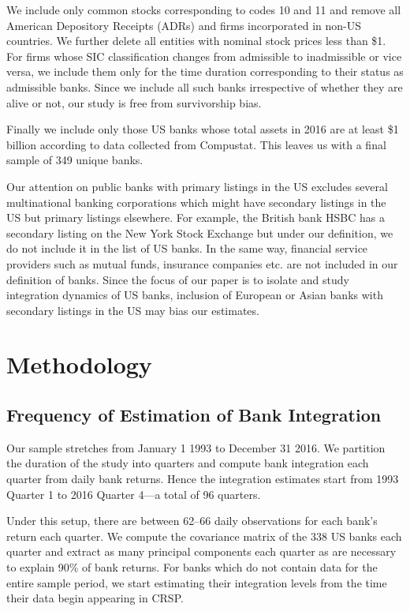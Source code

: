 \documentclass[11pt,]{article}
\begin{document}
We include only common stocks corresponding to codes 10 and 11 and
remove all American Depository Receipts (ADRs) and firms incorporated in
non-US countries. We further delete all entities with nominal stock
prices less than \$1. For firms whose SIC classification changes from
admissible to inadmissible or vice versa, we include them only for the
time duration corresponding to their status as admissible banks. Since
we include all such banks irrespective of whether they are alive or not,
our study is free from survivorship bias.

Finally we include only those US banks whose total assets in 2016 are at
least \$1 billion according to data collected from Compustat. This
leaves us with a final sample of 349 unique banks.

Our attention on public banks with primary listings in the US excludes
several multinational banking corporations which might have secondary
listings in the US but primary listings elsewhere. For example, the
British bank HSBC has a secondary listing on the New York Stock Exchange
but under our definition, we do not include it in the list of US banks.
In the same way, financial service providers such as mutual funds,
insurance companies etc. are not included in our definition of banks.
Since the focus of our paper is to isolate and study integration
dynamics of US banks, inclusion of European or Asian banks with
secondary listings in the US may bias our estimates.

\section{Methodology}\label{methodology}

\subsection{Frequency of Estimation of Bank
Integration}\label{frequency-of-estimation-of-bank-integration}

Our sample stretches from January 1 1993 to December 31 2016. We
partition the duration of the study into quarters and compute bank
integration each quarter from daily bank returns. Hence the integration
estimates start from 1993 Quarter 1 to 2016 Quarter 4---a total of 96
quarters.

Under this setup, there are between 62--66 daily observations for each
bank's return each quarter. We compute the covariance matrix of the 338
US banks each quarter and extract as many principal components each
quarter as are necessary to explain 90\% of bank returns. For banks
which do not contain data for the entire sample period, we start
estimating their integration levels from the time their data begin
appearing in CRSP.
\end{document}
